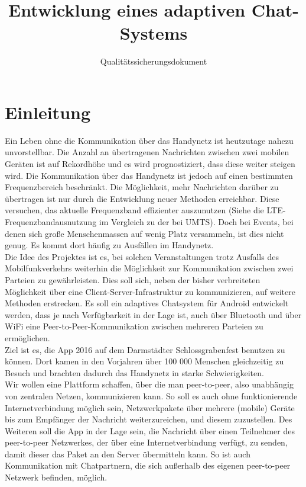 \documentclass[accentcolor=tud0b,12pt,paper=a4]{tudreport}
\title{Entwicklung eines adaptiven Chat-Systems}
\subtitle{Qualitätssicherungsdokument}
\begin{document}
	\maketitle
	\tableofcontents

	\chapter{Einleitung}
		Ein Leben ohne die Kommunikation über das Handynetz ist heutzutage nahezu unvorstellbar. Die Anzahl an übertragenen Nachrichten zwischen zwei mobilen Geräten ist auf Rekordhöhe und es wird prognostiziert, dass diese weiter steigen wird. Die Kommunikation über das Handynetz ist jedoch auf einen bestimmten Frequenzbereich beschränkt. Die Möglichkeit, mehr Nachrichten darüber zu übertragen ist nur durch die Entwicklung neuer Methoden erreichbar. Diese versuchen, das aktuelle Frequenzband effizienter auszunutzen (Siehe die LTE-Frequenzbandausnutzung im Vergleich zu der bei UMTS). Doch bei Events, bei denen sich große Menschenmassen auf wenig Platz versammeln, ist dies nicht genug. Es kommt dort häufig zu Ausfällen im Handynetz. \\

		Die Idee des Projektes ist es, bei solchen Veranstaltungen trotz Ausfalls des Mobilfunkverkehrs weiterhin die Möglichkeit zur Kommunikation zwischen zwei Parteien zu gewährleisten. Dies soll sich, neben der bisher verbreiteten Möglichkeit über eine Client-Server-Infrastruktur zu kommunizieren, auf weitere Methoden erstrecken. Es soll ein adaptives Chatsystem für Android entwickelt werden, dass je nach Verfügbarkeit in der Lage ist, auch über Bluetooth und über WiFi eine Peer-to-Peer-Kommunikation zwischen mehreren Parteien zu ermöglichen. \\

		Ziel ist es, die App 2016 auf dem Darmstädter Schlossgrabenfest benutzen zu können. Dort kamen in den Vorjahren über 100 000 Menschen gleichzeitig zu Besuch und brachten dadurch das Handynetz in starke Schwierigkeiten.\\

		Wir wollen eine Plattform schaffen, über die man peer-to-peer, also unabhängig von zentralen Netzen, kommunizieren kann. So soll es auch ohne funktionierende Internetverbindung möglich sein, Netzwerkpakete über mehrere (mobile) Geräte bis zum Empfänger der Nachricht weiterzureichen, und diesem zuzustellen. Des Weiteren soll die App in der Lage sein, die Nachricht über einen Teilnehmer des peer-to-peer Netzwerkes, der über eine Internetverbindung verfügt, zu senden, damit dieser das Paket an den Server übermitteln kann. So ist auch Kommunikation mit Chatpartnern, die sich außerhalb des eigenen peer-to-peer Netzwerk befinden, möglich.\\
\end{document}
